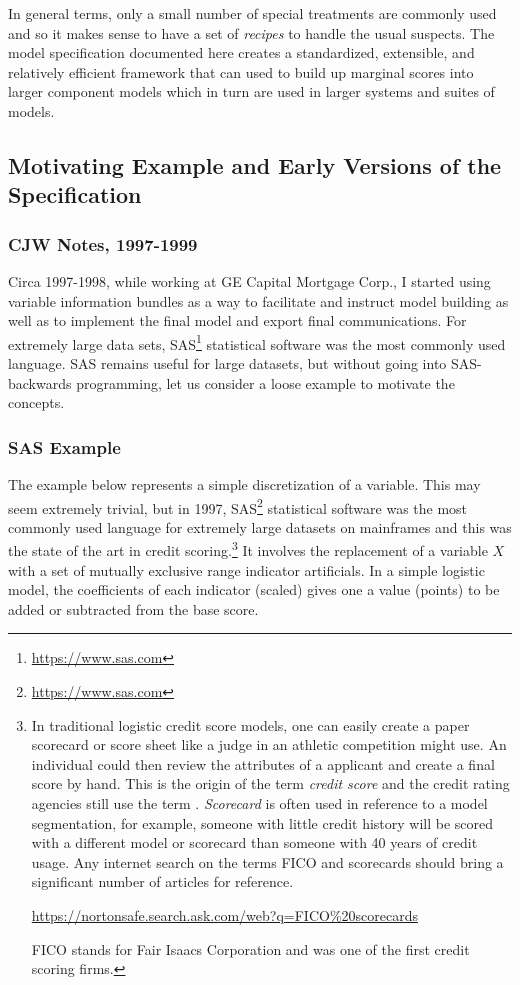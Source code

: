 \documentclass[10pt]{article}
\begin{document}
In general terms, only a small number of special treatments are commonly used and so it makes sense to have a set of {\em recipes} to handle
the usual suspects.  The model specification documented here creates a 
standardized, extensible, and relatively efficient framework that can used to build up marginal scores into larger component models
which in turn are used in larger systems and suites of models.

\subsection{Motivating Example and Early Versions of the Specification}

\ifcommentary

\subsubsection{CJW Notes, 1997-1999}
Circa 1997-1998, while working at GE Capital Mortgage Corp., I started using variable information bundles as a way to facilitate and
instruct model building as well as to implement the final model and export final communications.  For extremely large data sets,
SAS\footnote{\url{https://www.sas.com}} statistical software was the most commonly used language.  SAS remains useful for large
datasets, but without going into SAS-backwards programming, let us consider a loose example to motivate the concepts.   

\fi

\subsubsection{SAS Example}

The example below represents a simple discretization of a variable.  
This may seem extremely trivial, but 
in 1997, 
\ifcommentary\else 
SAS\footnote{\url{https://www.sas.com}} statistical software was the most commonly used language
for extremely large datasets on mainframes and \fi
this was the state of the art in credit scoring.\footnote{
    In traditional logistic credit score models, one can easily create a paper scorecard or score sheet like a judge
in an athletic competition might use. An individual could then review the
attributes of a applicant and create a final score by hand.  This is the origin of the term {\em credit score}
and the credit rating agencies still use the term . {\em Scorecard} is often used
in reference to a model segmentation, for example, someone with little credit history will be scored 
with a different model or scorecard than someone with 40 years of credit usage.
Any internet search on the terms FICO and scorecards should bring a significant number of articles for reference.\par
\url{https://nortonsafe.search.ask.com/web?q=FICO\%20scorecards}\par
FICO stands for Fair Isaacs Corporation and was one of the first credit scoring firms.
}
It involves the replacement of a
variable $X$ with a set of mutually exclusive range indicator artificials.  In a simple logistic 
model, the coefficients of each indicator (scaled) gives one a value (points) to be added or subtracted
from the base score.  
\end{document}
